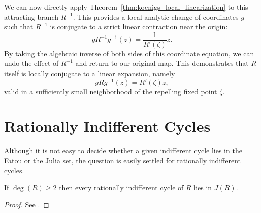 We can now directly apply Theorem~\ref{thm:koenigs_local_linearization} to this
attracting branch $R^{-1}$. This provides a local analytic change of coordinates
$g$ such that $R^{-1}$ is conjugate to a strict linear contraction near the
origin:
\begin{equation*}
    g R^{-1} g^{-1}(z) = \frac{1}{R'(\zeta)} z.
\end{equation*}
By taking the algebraic inverse of both sides of this coordinate equation, we
can undo the effect of $R^{-1}$ and return to our original map. This
demonstrates that $R$ itself is locally conjugate to a linear expansion, namely
\begin{equation*}
    g R g^{-1}(z) = R'(\zeta) z,
\end{equation*}
valid in a sufficiently small neighborhood of the repelling fixed point $\zeta$.

\section{Rationally Indifferent Cycles}
\label{sec:rationally_indifferent_cycles}

Although it is not easy to decide whether a given indifferent cycle lies in the
Fatou or the Julia set, the question is easily settled for rationally
indifferent cycles.

\begin{theorem}
    If $\deg(R) \geq 2$ then every rationally indifferent cycle of $R$ lies in
    $J(R)$.
\end{theorem}
\begin{proof}
    See \cite[111]{Beardon1991}.
\end{proof}

